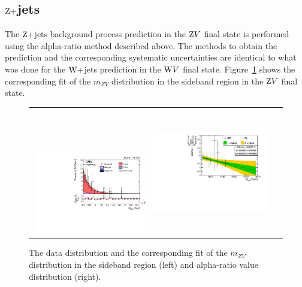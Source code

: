 \subsection{$\mathrm{Z}+$jets}
The $\mathrm{Z}+$jets background process prediction in the $\mathrm{Z} V$ final state is performed using the alpha-ratio method described above. The methods to obtain the prediction and the corresponding systematic uncertainties are identical to what was done for the $\mathrm{W}+$jets prediction in the $\mathrm{W} V$ final state. Figure~\ref{fig:zvfits} shows the corresponding fit of the $m_{ZV}$ distribution in the sideband region in the $\mathrm{Z} V$ final state.  

\begin{figure}[!htbp] 
	 \centering 
	 \begin{tabular}{cc}
	 \includegraphics[width=0.48\textwidth]{Plots/BackgroundEstimation/ZV/m_lvj_fitting/m_lvj_sb_lo_WJets0_xww__with_pull.pdf}
	 \includegraphics[width=0.48\textwidth,height=5.5cm]{Plots/BackgroundEstimation/ZV/ZVchannel_AlphaDistribution_AfterFit_New2.pdf}
	 \end{tabular}
	 \caption{The data distribution and the corresponding fit of the $m_{ZV}$ distribution in the sideband region (left) and alpha-ratio value distribution (right).}
	 \label{fig:zvfits}
\end{figure}




